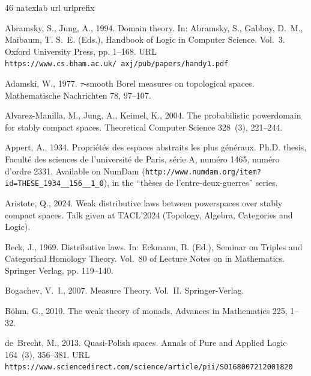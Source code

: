 \documentclass[preprint,12pt]{elsarticle}
\begin{document}

\ifarxiv
\begin{thebibliography}{46}
\expandafter\ifx\csname natexlab\endcsname\relax\def\natexlab#1{#1}\fi
\expandafter\ifx\csname url\endcsname\relax
  \def\url#1{\texttt{#1}}\fi
\expandafter\ifx\csname urlprefix\endcsname\relax\def\urlprefix{URL }\fi

Abramsky, S., Jung, A., 1994. Domain theory. In: Abramsky, S., Gabbay, D.~M.,
  Maibaum, T. S.~E. (Eds.), Handbook of Logic in Computer Science. Vol.~3.
  Oxford University Press, pp. 1--168.
\newline\urlprefix\url{https://www.cs.bham.ac.uk/~axj/pub/papers/handy1.pdf}

Adamski, W., 1977. {$\tau$}-smooth {B}orel measures on topological spaces.
  Mathematische Nachrichten 78, 97--107.

Alvarez-Manilla, M., Jung, A., Keimel, K., 2004. The probabilistic powerdomain
  for stably compact spaces. Theoretical Computer Science 328~(3), 221--244.

Appert, A., 1934. Propri{\'e}t{\'e}s des espaces abstraits les plus
  g{\'e}n{\'e}raux. Ph.D. thesis, Facult{\'e} des sciences de l'universit{\'e}
  de Paris, s{\'e}rie A, num{\'e}ro 1465, num{\'e}ro d'ordre 2331. Available on
  NumDam (\url{http://www.numdam.org/item?id=THESE_1934__156__1_0}), in the
  ``th{\`e}ses de l'entre-deux-guerres'' series.

Aristote, Q., 2024. Weak distributive laws between powerspaces over stably
  compact spaces. Talk given at TACL'2024 (Topology, Algebra, Categories and
  Logic).

Beck, J., 1969. Distributive laws. In: Eckmann, B. (Ed.), Seminar on Triples
  and Categorical Homology Theory. Vol.~80 of Lecture Notes on in Mathematics.
  Springer Verlag, pp. 119--140.

Bogachev, V.~I., 2007. Measure Theory. Vol.~II. Springer-Verlag.

B{\"o}hm, G., 2010. The weak theory of monads. Advances in Mathematics 225,
  1--32.

de~Brecht, M., 2013. Quasi-{P}olish spaces. Annals of Pure and Applied Logic
  164~(3), 356--381.
\newline\urlprefix\url{https://www.sciencedirect.com/science/article/pii/S0168007212001820}


\end{thebibliography}
\end{document}
